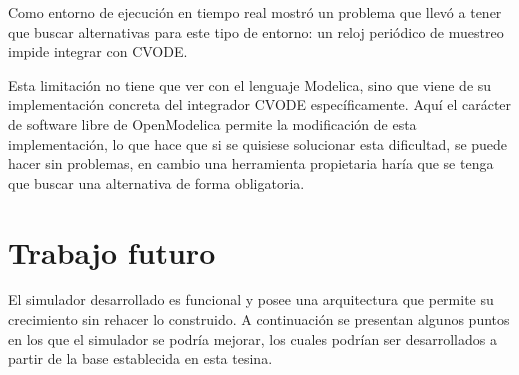 Como entorno de ejecución en tiempo real mostró un problema que llevó a tener que buscar alternativas para este tipo de entorno: un reloj periódico de muestreo impide integrar con CVODE.


Esta limitación no tiene que ver con el lenguaje Modelica, sino que viene de su implementación concreta del integrador CVODE específicamente. Aquí el carácter de software libre de OpenModelica permite la modificación de esta implementación, lo que hace que si se quisiese solucionar esta dificultad, se puede hacer sin problemas, en cambio una herramienta propietaria haría que se tenga que buscar una alternativa de forma obligatoria.

\section{Trabajo futuro}

El simulador desarrollado es funcional y posee una arquitectura que permite su crecimiento sin rehacer lo construido. A continuación se presentan algunos puntos en los que el simulador se podría mejorar, los cuales podrían ser desarrollados a partir de la base establecida en esta tesina.


